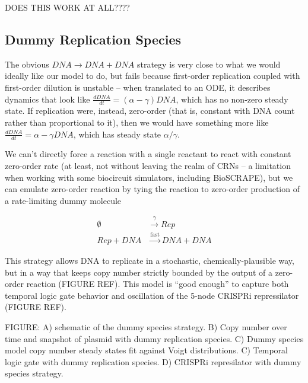 \documentclass[preprint,12pt]{elsarticle}
\begin{document}
DOES THIS WORK AT ALL????

\subsection{Dummy Replication Species}

The obvious $DNA \rightarrow DNA + DNA$ strategy is very close to what we would ideally like our model to do, but fails because first-order replication coupled with first-order dilution is unstable -- when translated to an ODE, it describes dynamics that look like $\frac{dDNA}{dt} = (\alpha - \gamma) DNA$, which has no non-zero steady state. If replication were, instead, zero-order (that is, constant with DNA count rather than proportional to it), then we would have something more like $\frac{dDNA}{dt} = \alpha - \gamma DNA$, which has steady state $\alpha / \gamma$. 

We can't directly force a reaction with a single reactant to react with constant zero-order rate (at least, not without leaving the realm of CRNs -- a limitation when working with some biocircuit simulators, including BioSCRAPE), but we can emulate zero-order reaction by tying the reaction to zero-order production of a rate-limiting dummy molecule

\begin{align}
	\emptyset &\xrightarrow{\gamma} Rep\\
	Rep + DNA &\xrightarrow{\text{fast}} DNA + DNA
\end{align}

This strategy allows DNA to replicate in a stochastic, chemically-plausible way, but in a way that keeps copy number strictly bounded by the output of a zero-order reaction (FIGURE REF). This model is ``good enough'' to capture both temporal logic gate behavior and oscillation of the 5-node CRISPRi repressilator (FIGURE REF).

\vspace{.5in}
FIGURE: A) schematic of the dummy species strategy. B) Copy number over time and snapshot of plasmid with dummy replication species. C) Dummy species model copy number steady states fit against Voigt distributions. C) Temporal logic gate with dummy replication species. D) CRISPRi represilator with dummy species strategy. 
\vspace{.5in}
\end{document}
